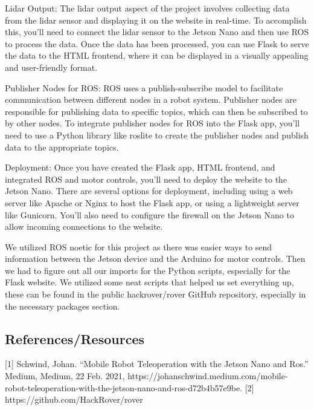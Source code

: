 \documentclass[a4paper, 10pt]{article}
\begin{document}
        Lidar Output: The lidar output aspect of the project involves collecting data from the lidar sensor and displaying it on the website in real-time. To accomplish this, you'll need to connect the lidar sensor to the Jetson Nano and then use ROS to process the data. Once the data has been processed, you can use Flask to serve the data to the HTML frontend, where it can be displayed in a visually appealing and user-friendly format.
        
        Publisher Nodes for ROS: ROS uses a publish-subscribe model to facilitate communication between different nodes in a robot system. Publisher nodes are responsible for publishing data to specific topics, which can then be subscribed to by other nodes. To integrate publisher nodes for ROS into the Flask app, you'll need to use a Python library like roslite to create the publisher nodes and publish data to the appropriate topics.
        
        Deployment: Once you have created the Flask app, HTML frontend, and integrated ROS and motor controls, you'll need to deploy the website to the Jetson Nano. There are several options for deployment, including using a web server like Apache or Nginx to host the Flask app, or using a lightweight server like Gunicorn. You'll also need to configure the firewall on the Jetson Nano to allow incoming connections to the website.

        We utilized ROS noetic for this project as there was easier ways to send information between the Jetson device and the Arduino for motor controls. Then we had to figure out all our imports for the Python scripts, especially for the Flask website. We utilized some neat scripts that helped us set everything up, these can be found in the public hackrover/rover GitHub repository, especially in the necessary packages section.

    \subsection{References/Resources}
		[1] Schwind, Johan. “Mobile Robot Teleoperation with the Jetson Nano and Ros.” Medium, Medium, 22 Feb. 2021, https://johanschwind.medium.com/mobile-robot-teleoperation-with-the-jetson-nano-and-ros-d72b4b57e9be. 
        [2] https://github.com/HackRover/rover


  
\end{document}
